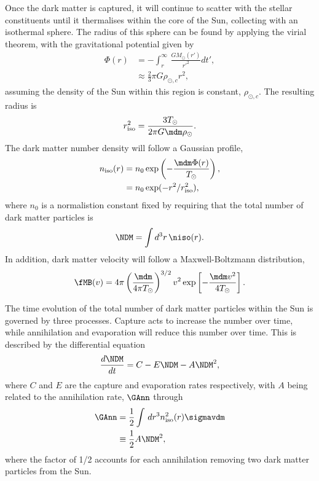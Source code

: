 Once the dark matter is captured, it will continue to scatter with the stellar constituents until it thermalises within the core of the Sun, collecting with an isothermal sphere. The radius of this sphere can be found by applying the virial theorem, with the gravitational potential given by
\begin{align}
    \Phi(r) & = -\int_r^\infty \,\frac{G M_\odot(r')}{r'^2}dt',\\
    &\approx \frac{2}{3}\pi G \rho_{\odot,c} r^2,
\end{align}
assuming the density of the Sun within this region is constant, $\rho_{\odot,c}$. The resulting radius is
\begin{equation}
    r_\mathrm{iso}^2 = \frac{3 T_\odot}{2\pi G \mdm \rho_\odot}.
\end{equation}
The dark matter number density will follow a Gaussian profile, 
\begin{align}
    n_\mathrm{iso}(r) &= n_0\exp\left( - \frac{\mdm \Phi(r)}{T_\odot}\right),\\
     & = n_0 \exp(-r^2/r_\mathrm{iso}^2),
\end{align}
where $n_0$ is a normalistion constant fixed by requiring that the total number of dark matter particles is 
\begin{equation}
    \NDM = \int d^3 r\, \niso(r).
\end{equation}
In addition, dark matter velocity will follow a Maxwell-Boltzmann distribution, 
\begin{equation}
    \fMB(v) = 4\pi\left(\frac{\mdm}{4\pi T_\odot}\right)^{3/2}v^2\exp\left[-\frac{\mdm v^2}{4 T_\odot}\right].
\end{equation}

The time evolution of the total number of dark matter particles within the Sun is governed by three processes. Capture acts to increase the number over time, while annihilation and evaporation will reduce this number over time. This is described by the differential equation
\begin{equation}
    \frac{d \NDM}{dt} = C  - E \NDM- A \NDM^2,
    \label{ch1:eq:DM_num_Sun}
\end{equation}
where $C$ and $E$ are the capture and evaporation rates respectively, with $A$ being related to the annihilation rate, $\GAnn$ through
\begin{align}
    \GAnn & = \frac{1}{2}\int\,dr^3 n_\mathrm{iso}^2(r) \sigmavdm\\
    & \equiv \frac{1}{2}A \NDM^2,
\end{align}
where the factor of 1/2 accounts for each annihilation removing two dark matter particles from the Sun. 

